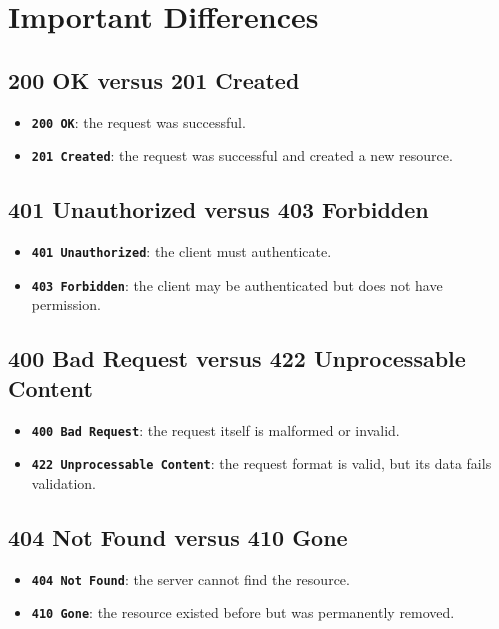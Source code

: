 \documentclass[a4paper]{article}
\newcommand{\httpcode}[1]{\texttt{\textbf{#1}}}
\begin{document}
    
    \section{Important Differences}
        
        \subsection{200 OK versus 201 Created}
            
            \begin{itemize}
                \item \httpcode{200 OK}: the request was successful.
                \item \httpcode{201 Created}: the request was successful and created a
                new resource.
            \end{itemize}
        
        \subsection{401 Unauthorized versus 403 Forbidden}
            
            \begin{itemize}
                \item \httpcode{401 Unauthorized}: the client must authenticate.
                \item \httpcode{403 Forbidden}: the client may be authenticated but does
                not have permission.
            \end{itemize}
        
        \subsection{400 Bad Request versus 422 Unprocessable Content}
            
            \begin{itemize}
                \item \httpcode{400 Bad Request}: the request itself is malformed or invalid.
                \item \httpcode{422 Unprocessable Content}: the request format is valid,
                but its data fails validation.
            \end{itemize}
        
        \subsection{404 Not Found versus 410 Gone}
            
            \begin{itemize}
                \item \httpcode{404 Not Found}: the server cannot find the resource.
                \item \httpcode{410 Gone}: the resource existed before but was permanently
                removed.
            \end{itemize}
            
            
            
\end{document}
